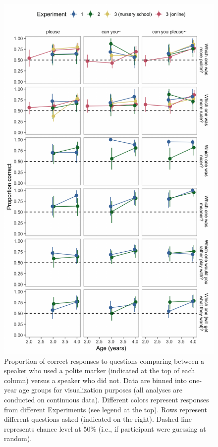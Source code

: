 \documentclass[10pt, letterpaper]{article}
\newenvironment{CodeChunk}{}{}
\begin{document}
\begin{CodeChunk}
\captionsetup{width=0.8\textwidth}\begin{figure}[h]

{\centering \includegraphics{figs/fig_results_placement-1} 

}

\caption[Proportion of correct responses to questions comparing between a speaker who used a polite marker (indicated at the top of each column) versus a speaker who did not]{Proportion of correct responses to questions comparing between a speaker who used a polite marker (indicated at the top of each column) versus a speaker who did not. Data are binned into one-year age groups for visualization purposes (all analyses are conducted on continuous data). Different colors represent responses from different Experiments (see legend at the top). Rows represent different questions asked (indicated on the right). Dashed line represents chance level at 50\% (i.e., if participant were guessing at random).}\label{fig:fig_results_placement}
\end{figure}
\end{CodeChunk}
\end{document}
